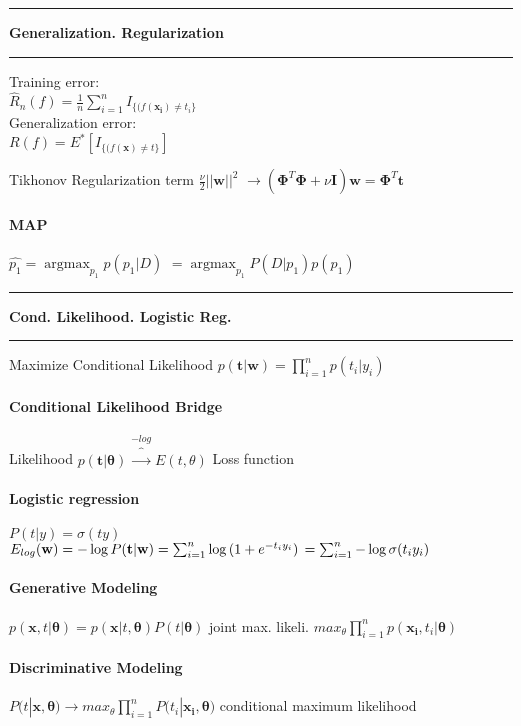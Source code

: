 \documentclass[7pt]{scrartcl}
\newlength{\secskip}
\renewcommand{\section}[1]{
  \hrule\vspace{.1em}
  \textbf{#1}
  \hrule
}
\DeclareMathOperator*{\argmax}{argmax}
\renewcommand{\vec}{\mathbf}
\begin{document}
\begin{multicols}{4}
\section{Generalization. Regularization}
Training error: \\
$\hat{R}_n(f) = \frac{1}{n} \sum_{i=1}^n I_{\{(f(\vec{x_i}) \neq t_i\}}$ \\
Generalization error: \\
$R(f) = E^*[I_{\{(f(\vec{x}) \neq t\}}]$

Tikhonov Regularization term $\frac{\nu}{2} ||\vec{w}||^2$
$\rightarrow (\vec{\Phi}^T \vec{\Phi} + \nu \vec{I})\vec{w} = \vec{\Phi}^T \vec{t}$

\paragraph{MAP}
$\hat{p_1} = \argmax_{p_1} p(p_1|D)$
$= \argmax_{p_1} P(D|p_1)p(p_1)$
\section{Cond. Likelihood. Logistic Reg.}
Maximize Conditional Likelihood $p(\vec t|\vec w) = \prod_{i=1}^n p(t_i|y_i)$
\paragraph{Conditional Likelihood Bridge}
Likelihood $p(\vec t|\vec \theta) \overbrace{\longrightarrow}^ {-log} E(t,\theta)$ Loss function
\paragraph{Logistic regression} $P(t|y) = \sigma(ty)$
$
 E_{log}(\vec w) = - \log P(\vec t | \vec w)\\
 = \sum\nolimits_{i=1}^n \log \left (1 + e^{-t_iy_i} \right)\\
 = \sum\nolimits_{i=1}^n -\log \sigma (t_iy_i)
$
\paragraph{Generative Modeling}
$p(\vec{x},t|\vec{\theta}) = p(\vec{x}|t,\vec{\theta})P(t|\vec{\theta})$
joint max. likeli. $max_{\theta} \prod_{i=1}^n p(\vec{x_i},t_i|\vec{\theta})$ 

\paragraph{Discriminative Modeling}
$P(t|\vec{x,\theta}) \rightarrow max_\theta \prod_{i=1}^n P(t_i|\vec{x_i,\theta)}$
conditional maximum likelihood

\end{multicols}
\end{document}
